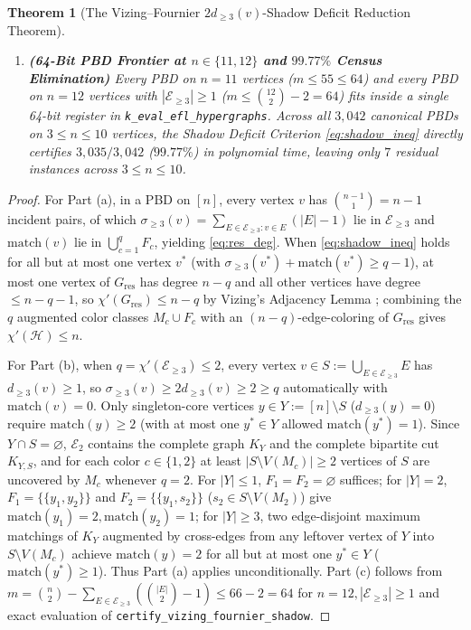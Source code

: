 \documentclass[11pt,reqno]{amsart}
\newtheorem{theorem}{Theorem}[section]
\theoremstyle{definition}
\theoremstyle{remark}
\begin{document}
\begin{theorem}[The Vizing--Fournier $2 d_{\ge 3}(v)$-Shadow Deficit Reduction Theorem]
\begin{enumerate}
  \item[\textup{(c)}] \textbf{(64-Bit PBD Frontier at $n \in \{11, 12\}$ and $99.77\%$ Census Elimination)} Every PBD on $n = 11$ vertices ($m \le 55 \le 64$) and every PBD on $n = 12$ vertices with $|\mathcal{E}_{\ge 3}| \ge 1$ ($m \le \binom{12}{2} - 2 = 64$) fits inside a single 64-bit register in \texttt{k\_eval\_efl\_hypergraphs}. Across all $3{,}042$ canonical PBDs on $3 \le n \le 10$ vertices, the Shadow Deficit Criterion \eqref{eq:shadow_ineq} directly certifies $3{,}035 / 3{,}042$ ($99.77\%$) in polynomial time, leaving only $7$ residual instances across $3 \le n \le 10$.
\end{enumerate}
\end{theorem}

\begin{proof}
For Part (a), in a PBD on $[n]$, every vertex $v$ has $\binom{n-1}{1} = n - 1$ incident pairs, of which $\sigma_{\ge 3}(v) = \sum_{E \in \mathcal{E}_{\ge 3} : v \in E}(|E| - 1)$ lie in $\mathcal{E}_{\ge 3}$ and $\mathrm{match}(v)$ lie in $\bigcup_{c=1}^q F_c$, yielding \eqref{eq:res_deg}. When \eqref{eq:shadow_ineq} holds for all but at most one vertex $v^*$ (with $\sigma_{\ge 3}(v^*) + \mathrm{match}(v^*) \ge q - 1$), at most one vertex of $G_{\mathrm{res}}$ has degree $n - q$ and all other vertices have degree $\le n - q - 1$, so $\chi'(G_{\mathrm{res}}) \le n - q$ by Vizing's Adjacency Lemma \cite{Vizing1964}; combining the $q$ augmented color classes $M_c \cup F_c$ with an $(n - q)$-edge-coloring of $G_{\mathrm{res}}$ gives $\chi'(\mathcal{H}) \le n$.

For Part (b), when $q = \chi'(\mathcal{E}_{\ge 3}) \le 2$, every vertex $v \in S := \bigcup_{E \in \mathcal{E}_{\ge 3}} E$ has $d_{\ge 3}(v) \ge 1$, so $\sigma_{\ge 3}(v) \ge 2 d_{\ge 3}(v) \ge 2 \ge q$ automatically with $\mathrm{match}(v) = 0$. Only singleton-core vertices $y \in Y := [n] \setminus S$ ($d_{\ge 3}(y) = 0$) require $\mathrm{match}(y) \ge 2$ (with at most one $y^* \in Y$ allowed $\mathrm{match}(y^*) = 1$). Since $Y \cap S = \varnothing$, $\mathcal{E}_2$ contains the complete graph $K_Y$ and the complete bipartite cut $K_{Y, S}$, and for each color $c \in \{1, 2\}$ at least $|S \setminus V(M_c)| \ge 2$ vertices of $S$ are uncovered by $M_c$ whenever $q = 2$. For $|Y| \le 1$, $F_1 = F_2 = \varnothing$ suffices; for $|Y| = 2$, $F_1 = \{\{y_1, y_2\}\}$ and $F_2 = \{\{y_1, s_2\}\}$ ($s_2 \in S \setminus V(M_2)$) give $\mathrm{match}(y_1) = 2, \mathrm{match}(y_2) = 1$; for $|Y| \ge 3$, two edge-disjoint maximum matchings of $K_Y$ augmented by cross-edges from any leftover vertex of $Y$ into $S \setminus V(M_c)$ achieve $\mathrm{match}(y) = 2$ for all but at most one $y^* \in Y$ ($\mathrm{match}(y^*) \ge 1$). Thus Part (a) applies unconditionally. Part (c) follows from $m = \binom{n}{2} - \sum_{E \in \mathcal{E}_{\ge 3}}(\binom{|E|}{2} - 1) \le 66 - 2 = 64$ for $n = 12, |\mathcal{E}_{\ge 3}| \ge 1$ and exact evaluation of \texttt{certify\_vizing\_fournier\_shadow}.
\end{proof}
\end{document}

